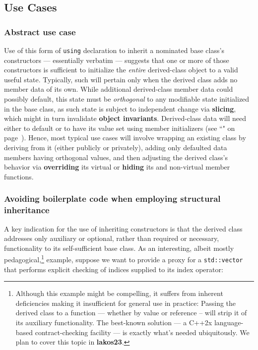 \subsection[Use Cases]{Use Cases}\label{use-cases-ctorinheriting}

\subsubsection[Abstract use case]{Abstract use case}\label{abstract-use-case}

Use of this form of \texttt{using} declaration to inherit a nominated
base class's constructors --- essentially verbatim --- suggests that one
or more of those constructors is sufficient to initialize the
\emph{entire} derived-class object to a valid useful state. Typically,
such will pertain only when the derived class adds no member data of its
own. While additional derived-class member data could possibly
default, this state must be \emph{orthogonal} to
any modifiable state initialized in the base class, as such state is
subject to independent change via \textbf{slicing}, which might in turn
invalidate \textbf{object invariants}. Derived-class data will need either
to default or to have its value set using member
initializers (see ``" on page~\pageref{Default-Member-Initializers}). Hence, most typical use cases will involve wrapping an
existing class by deriving from it (either publicly or privately),
adding only defaulted data members having orthogonal values, and then
adjusting the derived class's behavior via \textbf{overriding} its virtual
or \textbf{hiding} its and non-virtual member functions.

\subsubsection[Avoiding boilerplate code when employing structural inheritance]{Avoiding boilerplate code when employing structural inheritance}\label{avoiding-boilerplate-code-code-when-employing-structural-inheritance}

A key indication for the use of inheriting constructors is that the
derived class addresses only auxiliary or optional, rather than required
or necessary, functionality to its self-sufficient base class. As an
interesting, albeit mostly pedagogical,{\cprotect\footnote{Although this
example might be compelling, it suffers from inherent deficiencies
making it insufficient for general use in practice: Passing the
derived class to a function --- whether by value or reference -- will
strip it of its auxiliary functionality. The best-known solution --- a
C++2x language-based contract-checking facility --- is exactly what's
  needed ubiquitously. We plan to cover this topic in \textbf{lakos23}.}} example, suppose we
want to provide a proxy for a \texttt{std::vector} that performs
explicit checking of indices supplied to its index operator:

